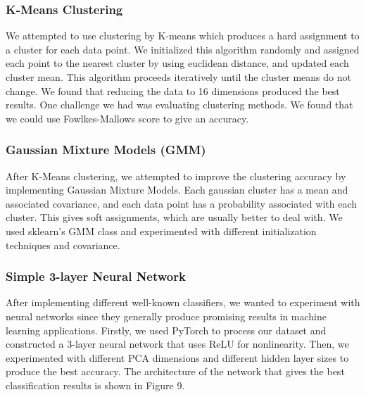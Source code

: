 \subsubsection{\textbf{K-Means Clustering}}
We attempted to use clustering by K-means which produces a hard assignment to a cluster for each data point. We initialized this algorithm randomly and assigned each point to the nearest cluster by using euclidean distance, and updated each cluster mean. This algorithm proceeds iteratively until the cluster means do not change. We found that reducing the data to 16 dimensions produced the best results. One challenge we had was evaluating clustering methods. We found that we could use Fowlkes-Mallows score to give an accuracy.

\subsubsection{\textbf{Gaussian Mixture Models (GMM)}}
After K-Means clustering, we attempted to improve the clustering accuracy by implementing Gaussian Mixture Models. Each gaussian cluster has a mean and associated covariance, and each data point has a probability associated with each cluster. This gives soft assignments, which are usually better to deal with. We used sklearn's GMM class and experimented with different initialization techniques and covariance. 

\subsubsection{\textbf{Simple 3-layer Neural Network}}
After implementing different well-known classifiers, we wanted to experiment with neural networks since they generally produce promising results in machine learning applications. Firstly, we used PyTorch to process our dataset and constructed a 3-layer neural network that uses ReLU for nonlinearity. Then, we experimented with different PCA dimensions and different hidden layer sizes to produce the best accuracy. The architecture of the network that gives the best classification results is shown in Figure 9. 


